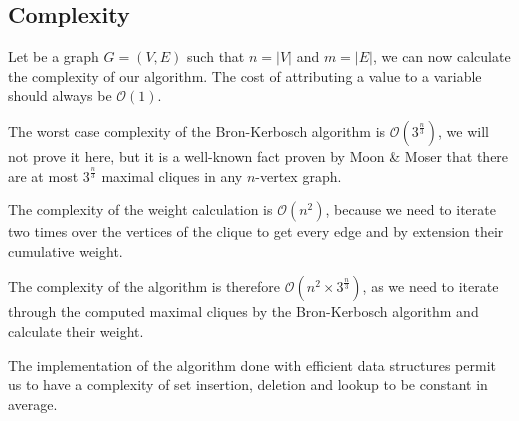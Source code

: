 \subsection{Complexity}

Let be a graph $G=(V,E)$ such that $n=|V|$ and $m=|E|$, we can now calculate the
complexity of our algorithm. The cost of attributing a value to a variable should
always be $\mathcal{O}(1)$. \newline

The worst case complexity of the Bron-Kerbosch algorithm is $\mathcal{O}(3^{\frac{n}{3}})$,
we will not prove it here, but it is a well-known fact proven by Moon \& Moser
\cite{on-cliques-in-graphs} that there are at most $3^{\frac{n}{3}}$ maximal cliques
in any $n$-vertex graph. \newline

The complexity of the weight calculation is $\mathcal{O}(n^2)$, because we need
to iterate two times over the vertices of the clique to get every edge and by
extension their cumulative weight. \newline

The complexity of the algorithm is therefore $\mathcal{O}(n^2\times3^{\frac{n}{3}})$,
as we need to iterate through the computed maximal cliques by the Bron-Kerbosch
algorithm and calculate their weight. \newline

The implementation of the algorithm done with efficient data structures permit us
to have a complexity of set insertion, deletion and lookup to be constant in average.
